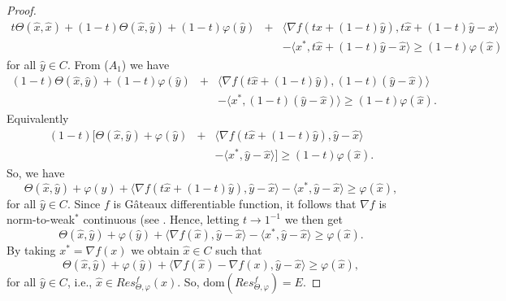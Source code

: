 \documentclass[reqno,b5paper]{amsart}
\theoremstyle{plain}
\theoremstyle{definition}
\numberwithin{equation}{section}
\numberwithin{equation}{section}
\begin{document}
\begin{proof}
\begin{eqnarray*}
t\Theta (\hat{x},\hat{x})+(1-t)\Theta (\hat{x},\hat{y})+(1-t)\varphi(\hat{y})&+&\langle \nabla f(t\hat{x}+(1-t)\hat{y}),t\hat{x}+(1-t)\hat{y}-\hat{x}\rangle\\
&& -\langle x^{*},t\hat{x}+(1-t)\hat{y}-\hat{x}\rangle\geq (1-t)\varphi(\hat{x})
\end{eqnarray*}
for all $\hat{y}\in C$. From ($A_{1}$) we have
\begin{eqnarray*}
(1-t)\Theta (\hat{x},\hat{y})+(1-t)\varphi(\hat{y})&+&\langle \nabla f(t\hat{x}+(1-t)\hat{y}),(1-t)(\hat{y}-\hat{x})\rangle\\
&& -\langle x^{*},(1-t)(\hat{y}-\hat{x})\rangle\geq (1-t)\varphi(\hat{x}).
\end{eqnarray*}
Equivalently
\begin{eqnarray*}
(1-t)[\Theta (\hat{x},\hat{y})+\varphi(\hat{y})&+&\langle \nabla f(t\hat{x}+(1-t)\hat{y}),\hat{y}-\hat{x}\rangle\\
&& -\langle x^{*},\hat{y}-\hat{x}\rangle]\geq (1-t)\varphi(\hat{x}).
\end{eqnarray*}
So, we have
$$\Theta (\hat{x},\hat{y})+\varphi(\hat{y})+\langle \nabla f(t\hat{x}+(1-t)\hat{y}),\hat{y}-\hat{x}\rangle-\langle x^{*},\hat{y}-\hat{x}\rangle\geq\varphi(\hat{x}),$$
for all $\hat{y}\in C$. Since $f$ is G\^{a}teaux differentiable function, it follows that $\nabla f$ is norm-to-weak$^{*}$ continuous (see \cite[Proposition 2.8]{phe}. Hence, letting $t\to1^{-1}$ we then get
$$\Theta (\hat{x},\hat{y})+\varphi(\hat{y})+\langle \nabla f(\hat{x}),\hat{y}-\hat{x}\rangle-\langle x^{*},\hat{y}-\hat{x}\rangle\geq\varphi(\hat{x}).$$
By taking $x^{*}=\nabla f(x)$ we obtain $\hat{x}\in C$ such that
$$\Theta (\hat{x},\hat{y})+\varphi(\hat{y})+\langle \nabla f(\hat{x})-\nabla f(x),\hat{y}-\hat{x}\rangle\geq\varphi(\hat{x}),$$
for all $\hat{y}\in C$, i.e., $\hat{x}\in Res_{\Theta,\varphi}^{f}(x)$. So, $\text{dom}(Res_{\Theta,\varphi}^{f})=E$.

\end{proof}
\end{document}
